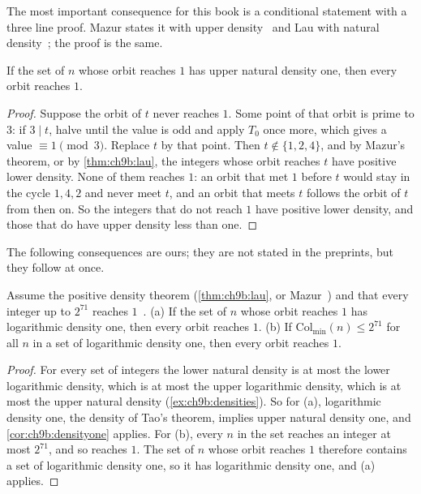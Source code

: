 The most important consequence for this book is a conditional statement with a three line proof. Mazur states it with upper density~\cite[Corollary~1.2]{mazur2026pred} and Lau with natural density~\cite[Corollary~1.6]{lau2026}; the proof is the same.

\begin{corollary}\label{cor:ch9b:densityone}
If the set of $n$ whose orbit reaches $1$ has upper natural density one, then every orbit reaches $1$.
\end{corollary}

\begin{proof}
Suppose the orbit of $t$ never reaches $1$. Some point of that orbit is prime to $3$: if $3\mid t$, halve until the value is odd and apply $T_0$ once more, which gives a value $\equiv1\pmod3$. Replace $t$ by that point. Then $t\notin\{1,2,4\}$, and by Mazur's theorem, or by \cref{thm:ch9b:lau}, the integers whose orbit reaches $t$ have positive lower density. None of them reaches $1$: an orbit that met $1$ before $t$ would stay in the cycle $1,4,2$ and never meet $t$, and an orbit that meets $t$ follows the orbit of $t$ from then on. So the integers that do not reach $1$ have positive lower density, and those that do have upper density less than one.
\end{proof}

The following consequences are ours; they are not stated in the preprints, but they follow at once.

\begin{proposition}\label{prop:ch9b:bounded}
Assume the positive density theorem (\cref{thm:ch9b:lau}, or Mazur~\cite[Theorem~1.1]{mazur2026pred}) and that every integer up to $2^{71}$ reaches $1$~\cite{barina2025}. (a) If the set of $n$ whose orbit reaches $1$ has logarithmic density one, then every orbit reaches $1$. (b) If $\mathrm{Col}_{\min}(n)\le2^{71}$ for all $n$ in a set of logarithmic density one, then every orbit reaches $1$.
\end{proposition}

\begin{proof}
For every set of integers the lower natural density is at most the lower logarithmic density, which is at most the upper logarithmic density, which is at most the upper natural density (\cref{ex:ch9b:densities}). So for (a), logarithmic density one, the density of Tao's theorem, implies upper natural density one, and \cref{cor:ch9b:densityone} applies. For (b), every $n$ in the set reaches an integer at most $2^{71}$, and so reaches $1$. The set of $n$ whose orbit reaches $1$ therefore contains a set of logarithmic density one, so it has logarithmic density one, and (a) applies.
\end{proof}


